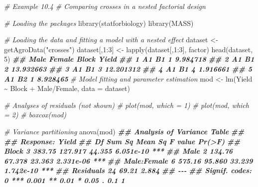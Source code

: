 \documentclass[
  12pt,
]{book}
\newenvironment{Shaded}{\begin{snugshade}}{\end{snugshade}}
\newcommand{\AttributeTok}[1]{\textcolor[rgb]{0.77,0.63,0.00}{#1}}
\newcommand{\CommentTok}[1]{\textcolor[rgb]{0.56,0.35,0.01}{\textit{#1}}}
\newcommand{\DecValTok}[1]{\textcolor[rgb]{0.00,0.00,0.81}{#1}}
\newcommand{\DocumentationTok}[1]{\textcolor[rgb]{0.56,0.35,0.01}{\textbf{\textit{#1}}}}
\newcommand{\FunctionTok}[1]{\textcolor[rgb]{0.00,0.00,0.00}{#1}}
\newcommand{\NormalTok}[1]{#1}
\newcommand{\OtherTok}[1]{\textcolor[rgb]{0.56,0.35,0.01}{#1}}
\newcommand{\SpecialCharTok}[1]{\textcolor[rgb]{0.00,0.00,0.00}{#1}}
\newcommand{\StringTok}[1]{\textcolor[rgb]{0.31,0.60,0.02}{#1}}
\begin{document}
\begin{Shaded}
\begin{Highlighting}[]
\CommentTok{\# Example 10.4}
\CommentTok{\# Comparing crosses in a nested factorial design}

\CommentTok{\# Loading the packages}
\FunctionTok{library}\NormalTok{(statforbiology)}
\FunctionTok{library}\NormalTok{(MASS)}

\CommentTok{\# Loading the data and fitting a model with a nested effect}
\NormalTok{dataset }\OtherTok{\textless{}{-}} \FunctionTok{getAgroData}\NormalTok{(}\StringTok{"crosses"}\NormalTok{)}
\NormalTok{dataset[,}\DecValTok{1}\SpecialCharTok{:}\DecValTok{3}\NormalTok{] }\OtherTok{\textless{}{-}} \FunctionTok{lapply}\NormalTok{(dataset[,}\DecValTok{1}\SpecialCharTok{:}\DecValTok{3}\NormalTok{], factor)}
\FunctionTok{head}\NormalTok{(dataset, }\DecValTok{5}\NormalTok{)}
\DocumentationTok{\#\#   Male Female Block     Yield}
\DocumentationTok{\#\# 1   A1     B1     1  9.984718}
\DocumentationTok{\#\# 2   A1     B1     2 13.932663}
\DocumentationTok{\#\# 3   A1     B1     3 12.201312}
\DocumentationTok{\#\# 4   A1     B1     4  1.916661}
\DocumentationTok{\#\# 5   A1     B2     1  8.928465}
\CommentTok{\# Model fitting and parameter estimation}
\NormalTok{mod }\OtherTok{\textless{}{-}} \FunctionTok{lm}\NormalTok{(Yield }\SpecialCharTok{\textasciitilde{}}\NormalTok{ Block }\SpecialCharTok{+}\NormalTok{ Male}\SpecialCharTok{/}\NormalTok{Female, }\AttributeTok{data =}\NormalTok{ dataset)}

\CommentTok{\# Analyses of residuals (not shown)}
\CommentTok{\# plot(mod, which = 1)}
\CommentTok{\# plot(mod, which = 2)}
\CommentTok{\# boxcox(mod)}

\CommentTok{\# Variance partitioning}
\FunctionTok{anova}\NormalTok{(mod)}
\DocumentationTok{\#\# Analysis of Variance Table}
\DocumentationTok{\#\# }
\DocumentationTok{\#\# Response: Yield}
\DocumentationTok{\#\#             Df Sum Sq Mean Sq F value    Pr(\textgreater{}F)    }
\DocumentationTok{\#\# Block        3 383.75 127.917  44.355 6.051e{-}10 ***}
\DocumentationTok{\#\# Male         2 134.76  67.378  23.363 2.331e{-}06 ***}
\DocumentationTok{\#\# Male:Female  6 575.16  95.860  33.239 1.742e{-}10 ***}
\DocumentationTok{\#\# Residuals   24  69.21   2.884                      }
\DocumentationTok{\#\# {-}{-}{-}}
\DocumentationTok{\#\# Signif. codes:  0 \textquotesingle{}***\textquotesingle{} 0.001 \textquotesingle{}**\textquotesingle{} 0.01 \textquotesingle{}*\textquotesingle{} 0.05 \textquotesingle{}.\textquotesingle{} 0.1 \textquotesingle{} \textquotesingle{} 1}
\end{Highlighting}
\end{Shaded}
\end{document}
